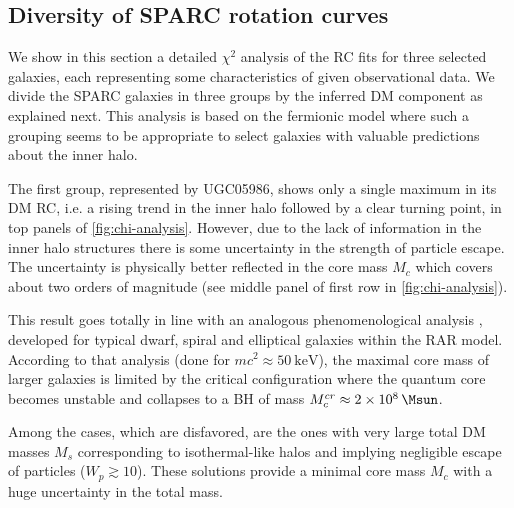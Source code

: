\subsection[Best-fit analysis]{Diversity of SPARC rotation curves}
\label{sec:result:limitations}

We show in this section a detailed $\chi^2$ analysis of the RC fits for three selected galaxies, each representing some characteristics of given observational data. We divide the SPARC galaxies in three groups by the inferred DM component as explained next. This analysis is based on the fermionic model where such a grouping seems to be appropriate to select galaxies with valuable predictions about the inner halo.

The first group, represented by UGC05986, shows only a single maximum in its DM RC, i.e. a rising trend in the inner halo followed by a clear turning point,  in top panels of \cref{fig:chi-analysis}. However, due to the lack of information in the inner halo structures there is some uncertainty in the strength of particle escape. The uncertainty is physically better reflected in the core mass $M_c$ which covers about two orders of magnitude (see middle panel of first row in \cref{fig:chi-analysis}).


This result goes totally in line with an analogous phenomenological analysis \citep{2019PDU....24..278A}, developed for typical dwarf, spiral and elliptical galaxies within the RAR model. According to that analysis (done for $mc^2\approx \SI{50}{\kilo\eV}$), the maximal core mass of larger galaxies is limited by the critical configuration where the quantum core becomes unstable and collapses to a BH of mass $M_c^{cr} \approx \SI{2E8}{\Msun}$.

Among the cases, which are disfavored, are the ones with very large total DM masses $M_s$ corresponding to isothermal-like halos and implying negligible escape of particles ($W_p \gtrsim 10$). These solutions provide a minimal core mass $M_c$ with a huge uncertainty in the total mass.

